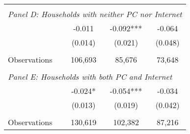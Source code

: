 {\begin{tabular}{lccc}
&  &  &   \\
\multicolumn{4}{l}{\textit{Panel D: Households with neither PC nor Internet}} \\
\hspace{3mm}        &      -0.011   &      -0.092***&      -0.064   \\
                    &     (0.014)   &     (0.021)   &     (0.048)   \\
                    &               &               &               \\
\hspace{3mm}Observations&     106,693   &      85,676   &      73,648   \\
 
&  &  &   \\
\multicolumn{4}{l}{\textit{Panel E: Households with both PC and Internet}} \\
\hspace{3mm}        &      -0.024*  &      -0.054***&      -0.034   \\
                    &     (0.013)   &     (0.019)   &     (0.042)   \\
                    &               &               &               \\
\hspace{3mm}Observations&     130,619   &     102,382   &      87,216   \\
 

\bottomrule
\end{tabular}
}
